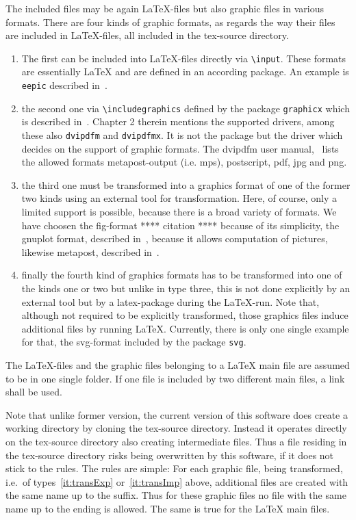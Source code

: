 \documentclass[12pt]{article}
\begin{document}
The included files may be again \LaTeX-files but also graphic files 
in various formats. 
There are four kinds of graphic formats, 
as regards the way their files are included in \LaTeX-files, 
all included in the tex-source directory. 
%
\begin{enumerate}
\item
The first can be included into \LaTeX-files directly 
via {\tt\textbackslash input}. 
These formats are essentially \LaTeX{} and are defined in an according package. 
An example is {\tt eepic} described in~\cite{EEpic}. 
\item
the second one via {\tt\textbackslash includegraphics} 
defined by the package {\tt graphicx} 
which is described in~\cite{GraX}. 
Chapter 2 therein mentions the supported drivers, 
among these also {\tt dvipdfm} and {\tt dvipdfmx}. 
It is not the package but the driver 
which decides on the support of graphic formats. 
The dvipdfm user manual,~\cite{DviPdfMx} lists the allowed formats 
metapost-output (i.e. \gls{mps}), postscript, 
\gls{pdf}, \gls{jpg} and \gls{png}. 
\item\label{it:transExp}
the third one must be transformed into a graphics format 
of one of the former two kinds using an external tool for transformation. 
Here, of course, only a limited support is possible, 
because there is a broad variety of formats. 
We have choosen the \gls{fig}-format **** citation **** because of its simplicity, 
the gnuplot format, described in~\cite{GnuPlot}, 
because it allows computation of pictures, 
likewise metapost, described in~\cite{MPost}. 
\item\label{it:transImp}
finally the fourth kind of graphics formats 
has to be transformed into one of the kinds one or two 
but unlike in type three, this is not done explicitly 
by an external tool but by a latex-package during the \LaTeX-run. 
Note that, although not required to be explicitly transformed, 
those graphics files induce additional files 
by running \LaTeX. 
Currently, there is only one single example for that, 
the \gls{svg}-format included by the package {\tt svg}. 
\end{enumerate}

The \LaTeX-files and the graphic files belonging to a \LaTeX{} main file 
are assumed to be in one single folder. 
If one file is included by two different main files, 
a link shall be used. 

Note that unlike former version, 
the current version of this software does create a working directory 
by cloning the tex-source directory. 
Instead it operates directly on the tex-source directory 
also creating intermediate files. 
Thus a file residing in the tex-source directory 
risks being overwritten by this software, 
if it does not stick to the rules. 
The rules are simple: 
For each graphic file, being transformed, 
i.e.~of types~\ref{it:transExp} or~\ref{it:transImp} above, 
additional files are created with the same name up to the suffix. 
Thus for these graphic files no file with the same name 
up to the ending is allowed. 
The same is true for the \LaTeX{} main files. 
\end{document}
